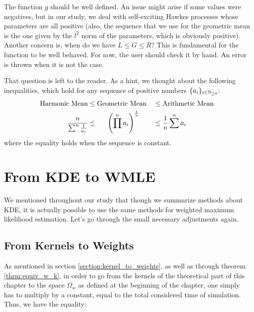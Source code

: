 


The function $g$ should be well defined. An issue might arise if some values were negatives, but in our study, we deal with self-exciting Hawkes processes whose parameters are all positive (also, the sequence that we use for the geometric mean is the one given by the $l^2$ norm of the parameters, which is obviously positive). Another concern is, when do we have $L \leq G \leq R$? This is fundamental for the function to be well behaved. For now, the user should check it by hand. An error is thrown when it is not the case.


That question is left to the reader. As a hint, we thought about the following inequalities, which hold for any sequence of positive numbers $\{ a_i \}_{ i \in \mathbb{N}_{\geq 0}}$:
\begin{alignat}{2}
\text{Harmonic Mean} 
&\leq \text{Geometric Mean} 
&& \leq \text{Arithmetic Mean} \notag \\
\frac n {\sum^n \frac 1 {a_i} } 
& \leq \hspace{0.55 cm} \left ( \prod^n a_i \right ) ^{ \frac 1 n } 
&& \leq \frac 1 n \sum^n a_i \notag
\end{alignat}
where the equality holds when the sequence is constant.


















\section{From KDE to WMLE}

We mentioned throughout our study that though we summarize methods about KDE, it is actually possible to use the same methods for weighted maximum likelihood estimation. Let's go through the small necessary adjustments again.

\subsection{From Kernels to Weights}
As mentioned in section \ref{section:kernel_to_weights}, as well as through theorem \ref{thrm:equiv_w_k}, in order to go from the kernels of the theoretical part of this chapter to the space $\Omega_w$ as defined at the beginning of the chapter, one simply has to multiply by a constant, equal to the total considered time of simulation. Thus, we have the equality:

